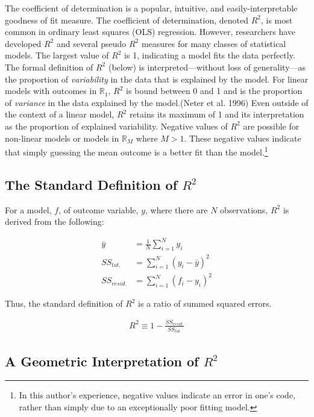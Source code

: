 \documentclass[conference,final,]{IEEEtran}
\begin{document}
The coefficient of determination is a popular, intuitive, and
easily-interpretable goodness of fit measure. The coefficient of
determination, denoted \(R^2\), is most common in ordinary least squares
(OLS) regression. However, researchers have developed \(R^2\) and
several pseudo \(R^2\) measures for many classes of statistical models.
The largest value of \(R^2\) is 1, indicating a model fits the data
perfectly. The formal definition of \(R^2\) (below) is
interpreted---without loss of generality---as the proportion of
\emph{variability} in the data that is explained by the model. For
linear models with outcomes in \(\mathbb{R}_1\), \(R^2\) is bound
between 0 and 1 and is the proportion of \emph{variance} in the data
explained by the model.(Neter et al. 1996) Even outside of the context
of a linear model, \(R^2\) retains its maximum of 1 and its
interpretation as the proportion of explained variability. Negative
values of \(R^2\) are possible for non-linear models or models in
\(\mathbb{R}_M\) where \(M > 1\). These negative values indicate that
simply guessing the mean outcome is a better fit than the
model.\footnote{In this author's experience, negative values indicate an
  error in one's code, rather than simply due to an exceptionally poor
  fitting model.}

\hypertarget{the-standard-definition-of-r2}{%
\subsection{\texorpdfstring{The Standard Definition of
\(R^2\)}{The Standard Definition of R\^{}2}}\label{the-standard-definition-of-r2}}

For a model, \(f\), of outcome variable, \(y\), where there are \(N\)
observations, \(R^2\) is derived from the following:

\begin{align}
  \bar{y} &= \frac{1}{N}\sum_{i=1}^{N}y_i\\
  SS_{tot.} &= \sum_{i=1}^N{(y_i-\bar{y})^2}\\
  SS_{resid.} &= \sum_{i=1}^N{(f_i-y_i)^2}
\end{align}

Thus, the standard definition of \(R^2\) is a ratio of summed squared
errors.

\begin{align}
    R^2 \equiv 1 - \frac{SS_{resid.}}{SS_{tot.}}
\end{align}

\hypertarget{a-geometric-interpretation-of-r2}{%
\subsection{\texorpdfstring{A Geometric Interpretation of
\(R^2\)}{A Geometric Interpretation of R\^{}2}}\label{a-geometric-interpretation-of-r2}}
\end{document}
